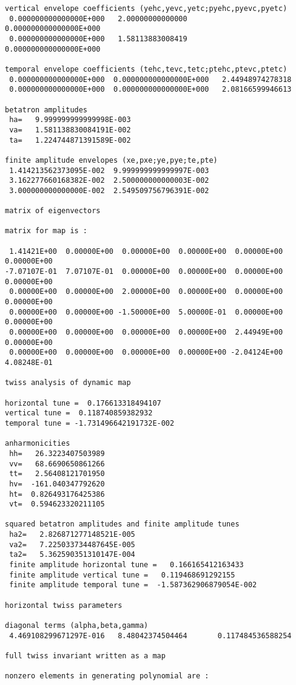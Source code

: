 \begin{footnotesize}
\begin{verbatim}
vertical envelope coefficients (yehc,yevc,yetc;pyehc,pyevc,pyetc)
 0.000000000000000E+000   2.00000000000000       0.000000000000000E+000
 0.000000000000000E+000   1.58113883008419       0.000000000000000E+000

temporal envelope coefficients (tehc,tevc,tetc;ptehc,ptevc,ptetc)
 0.000000000000000E+000  0.000000000000000E+000   2.44948974278318
 0.000000000000000E+000  0.000000000000000E+000   2.08166599946613

betatron amplitudes
 ha=   9.999999999999998E-003
 va=   1.581138830084191E-002
 ta=   1.224744871391589E-002

finite amplitude envelopes (xe,pxe;ye,pye;te,pte)
 1.414213562373095E-002  9.999999999999997E-003
 3.162277660168382E-002  2.500000000000003E-002
 3.000000000000000E-002  2.549509756796391E-002

matrix of eigenvectors

matrix for map is :

 1.41421E+00  0.00000E+00  0.00000E+00  0.00000E+00  0.00000E+00 0.00000E+00
-7.07107E-01  7.07107E-01  0.00000E+00  0.00000E+00  0.00000E+00 0.00000E+00
 0.00000E+00  0.00000E+00  2.00000E+00  0.00000E+00  0.00000E+00 0.00000E+00
 0.00000E+00  0.00000E+00 -1.50000E+00  5.00000E-01  0.00000E+00 0.00000E+00
 0.00000E+00  0.00000E+00  0.00000E+00  0.00000E+00  2.44949E+00 0.00000E+00
 0.00000E+00  0.00000E+00  0.00000E+00  0.00000E+00 -2.04124E+00 4.08248E-01

twiss analysis of dynamic map

horizontal tune =  0.176613318494107
vertical tune =  0.118740859382932
temporal tune = -1.731496642191732E-002

anharmonicities
 hh=   26.3223407503989
 vv=   68.6690650861266
 tt=   2.56408121701950
 hv=  -161.040347792620
 ht=  0.826493176425386
 vt=  0.594623320211105

squared betatron amplitudes and finite amplitude tunes
 ha2=   2.826871277148521E-005
 va2=   7.225033734487645E-005
 ta2=   5.362590351310147E-004
 finite amplitude horizontal tune =   0.166165412163433
 finite amplitude vertical tune =   0.119468691292155
 finite amplitude temporal tune =  -1.587362906879054E-002

horizontal twiss parameters

diagonal terms (alpha,beta,gamma)
 4.469108299671297E-016   8.48042374504464       0.117484536588254

full twiss invariant written as a map

nonzero elements in generating polynomial are :


\end{verbatim}
\end{footnotesize}
